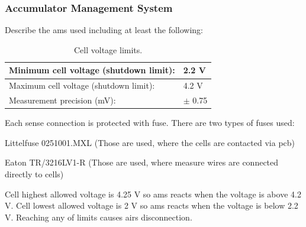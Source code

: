 \subsubsection{Accumulator Management System}
Describe the \gls{ams} used including at least the following:

\begin{table}[H]
	\centering
	\caption{Cell voltage limits.}
	\begin{tabularx}{\textwidth}{|X|X|}
		\hline
		Minimum cell voltage (shutdown limit): & 2.2 V \\[\TableSize]
		\hline
		Maximum cell voltage (shutdown limit): & 4.2 V \\[\TableSize]
		\hline
		Measurement precision (mV): & $\pm$ 0.75 \\[\TableSize]
		\hline
	\end{tabularx}%
	\label{tab:acc-limits}%
\end{table}%


Each sense connection is protected with fuse. There are two types of fuses used: 

\noindent Littelfuse 0251001.MXL (Those are used, where the cells are contacted via \gls{pcb})

\noindent Eaton TR/3216LV1-R (Those are used, where measure wires are connected directly to cells)

Cell highest allowed voltage is 4.25 V so \gls{ams} reacts when the voltage is above 4.2 V. Cell lowest allowed voltage is 2 V so \gls{ams} reacts when the voltage is below 2.2 V. Reaching any of limits causes \glspl{air} disconnection.

